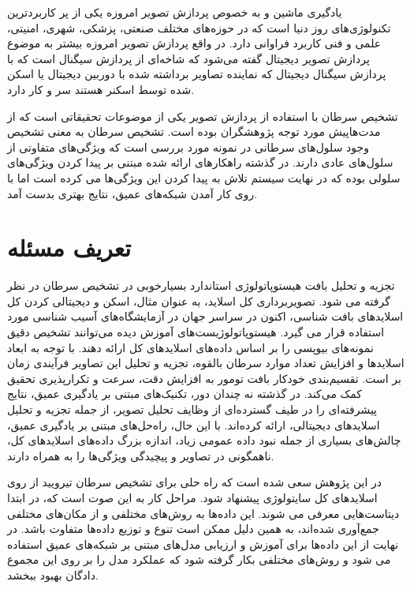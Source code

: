
یادگیری ماشین و به خصوص پردازش تصویر امروزه یکی از پر کاربردترین تکنولوژی‌های روز دنیا است که در حوزه‌های مختلف صنعتی، پزشکی، شهری، امنیتی، علمی و فنی کاربرد فراوانی دارد.
در واقع پردازش تصویر امروزه بیشتر به موضوع پردازش تصویر دیجیتال گفته می‌شود که شاخه‌ای از پردازش سیگنال است که با پردازش سیگنال دیجیتال که نماینده تصاویر برداشته شده با دوربین دیجیتال یا اسکن شده توسط اسکنر هستند سر و کار دارد.

تشخیص سرطان با استفاده از پردازش تصویر یکی از موضوعات تحقیقاتی است که از مدت‌هاپیش مورد توجه پژوهشگران بوده است. تشخیص سرطان به معنی تشخیص وجود سلول‌های سرطانی در نمونه مورد بررسی است که ویژگی‌های متفاوتی از سلول‌های عادی دارند. در گذشته راهکارهای ارائه شده مبتنی بر پیدا کردن ویژگی‌های سلولی بوده که در نهایت سیستم تلاش به پیدا کردن این ویژگی‌ها می کرده است اما با روی کار آمدن شبکه‌های عمیق، نتایج بهتری بدست آمد.

\section{تعریف مسئله}\label{sec:تعریف-مسئله}
تجزیه و تحلیل بافت هیستوپاتولوژی استاندارد بسیارخوبی در تشخیص سرطان در نظر گرفته می شود. تصویربرداری کل اسلاید، به عنوان مثال، اسکن و دیجیتالی کردن کل اسلایدهای بافت شناسی، اکنون در سراسر جهان در آزمایشگاه‌های آسیب شناسی مورد استفاده قرار می گیرد. هیستوپاتولوژیست‌های آموزش دیده می‌توانند تشخیص دقیق نمونه‌های بیوپسی را بر اساس داده‌های اسلاید‌های کل ارائه دهند. با توجه به ابعاد اسلاید‌ها و افزایش تعداد موارد سرطان بالقوه، تجزیه و تحلیل این تصاویر فرآیندی زمان بر است. تقسیم‌بندی خودکار بافت تومور به افزایش دقت، سرعت و تکرارپذیری تحقیق کمک می‌کند. در گذشته نه چندان دور، تکنیک‌های مبتنی بر یادگیری عمیق، نتایج پیشرفته‌ای را در طیف گسترده‌ای از وظایف تحلیل تصویر، از جمله تجزیه و تحلیل اسلایدهای دیجیتالی، ارائه کرده‌اند. با این حال، راه‌حل‌های مبتنی بر یادگیری عمیق، چالش‌های بسیاری از جمله نبود داده عمومی زیاد، اندازه بزرگ داده‌های اسلاید‌های کل، ناهمگونی در تصاویر و پیچیدگی ویژگی‌ها را به همراه دارند.

در این پژوهش سعی شده است که راه حلی  برای تشخیص سرطان تیرویید از روی اسلاید‌های کل سایتولوژی پیشنهاد شود.
مراحل کار به این صوت است که، در ابتدا دیتاست‌هایی معرفی می شوند. این داده‌ها به روش‌های مختلفی و از مکان‌های مختلفی جمع‌آوری شده‌اند، به همین دلیل ممکن است تنوع و توزیع داده‌ها متفاوت باشد.
در نهایت از این داده‌ها برای آموزش و ارزیابی مدل‌های مبتنی بر شبکه‌های عمیق استفاده می شود و روش‌های مختلفی بکار گرفته شود که عملکرد مدل را بر روی این مجموع دادگان بهبود ببخشد.

